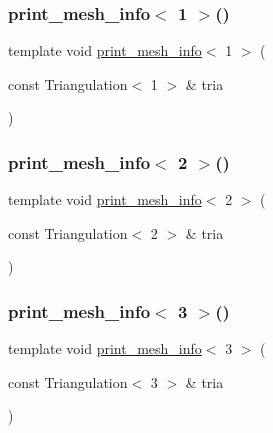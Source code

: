 \subsubsection{\texorpdfstring{print\+\_\+mesh\+\_\+info$<$ 1 $>$()}{print\_mesh\_info< 1 >()}}
{\footnotesize\ttfamily template void \mbox{\hyperlink{group___supplementary_ga2971a293263dddc17f3df81add2ffbbe}{print\+\_\+mesh\+\_\+info}}$<$ 1 $>$ (\begin{DoxyParamCaption}\item[{const Triangulation$<$ 1 $>$ \&}]{tria }\end{DoxyParamCaption})}

\mbox{\label{supplementary_functions_8cc_a26717733da51a761f009de3a1e57cf15}} 
\subsubsection{\texorpdfstring{print\+\_\+mesh\+\_\+info$<$ 2 $>$()}{print\_mesh\_info< 2 >()}}
{\footnotesize\ttfamily template void \mbox{\hyperlink{group___supplementary_ga2971a293263dddc17f3df81add2ffbbe}{print\+\_\+mesh\+\_\+info}}$<$ 2 $>$ (\begin{DoxyParamCaption}\item[{const Triangulation$<$ 2 $>$ \&}]{tria }\end{DoxyParamCaption})}

\mbox{\label{supplementary_functions_8cc_a6bd7935769f623c78960b765b08865c2}} 
\subsubsection{\texorpdfstring{print\+\_\+mesh\+\_\+info$<$ 3 $>$()}{print\_mesh\_info< 3 >()}}
{\footnotesize\ttfamily template void \mbox{\hyperlink{group___supplementary_ga2971a293263dddc17f3df81add2ffbbe}{print\+\_\+mesh\+\_\+info}}$<$ 3 $>$ (\begin{DoxyParamCaption}\item[{const Triangulation$<$ 3 $>$ \&}]{tria }\end{DoxyParamCaption})}

